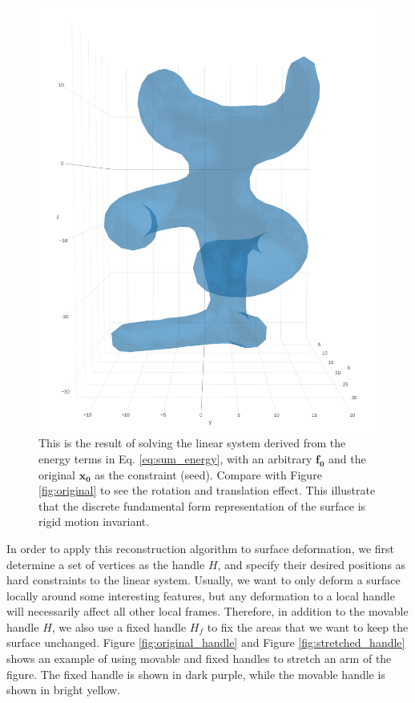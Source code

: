 \documentclass{6838publ}
\begin{document}
\begin{figure}[t!]  \centering
  \includegraphics[width=.6\linewidth]{rotated}
\caption{This is the result of solving the linear system derived from
the energy terms in Eq. \ref{eq:sum_energy}, with an arbitrary
$\mathbf{f_0}$ and the original $\mathbf{x_0}$ as the constraint
(seed).  Compare with Figure \ref{fig:original} to see the rotation
and translation effect. This illustrate that the discrete fundamental
form representation of the surface is rigid motion invariant.}
\label{fig:rotated}
\end{figure} In order to apply this reconstruction algorithm to
surface deformation, we first determine a set of vertices as the
handle $H$, and specify their desired positions as hard constraints to
the linear system. Usually, we want to only deform a surface locally
around some interesting features, but any deformation to a local
handle will necessarily affect all other local frames. Therefore, in
addition to the movable handle $H$, we also use a fixed handle $H_{f}$
to fix the areas that we want to keep the surface unchanged. Figure
\ref{fig:original_handle} and Figure \ref{fig:stretched_handle} shows
an example of using movable and fixed handles to stretch an arm of the
figure. The fixed handle is shown in dark purple, while the movable
handle is shown in bright yellow.
\end{document}
